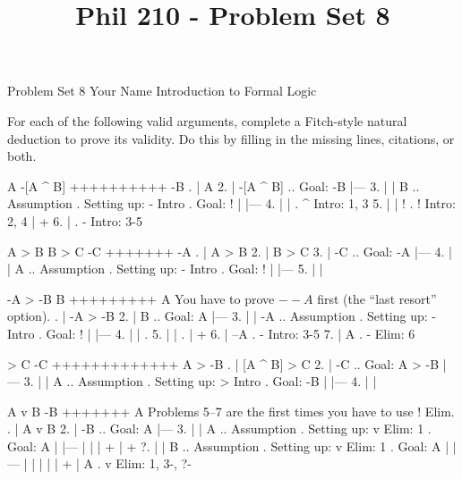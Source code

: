 
\title{Phil 210 - Problem Set 8}

\heading
Problem Set 8
Your Name
Introduction to Formal Logic
\endheading

For each of the following valid arguments, complete a Fitch-style natural deduction to prove its validity. Do this by filling in the missing lines, citations, or both.

\problems
{}
\argument
 A
 -[A ^ B]
++++++++++
 -B
\endargument
        \answer
        . | A
         2. | -[A ^ B]   ..  Goal: -B
            |---
         3. |   | B      ..  Assumption  .  Setting up: - Intro  .  Goal: !
            |   |---
         4. |   |        .  ^ Intro: 1, 3
         5. |   | !      .  ! Intro: 2, 4
            |   +
         6. |            .  - Intro: 3-5
        \endfitchproof
        \endanswer

\argument
 A > B
 B > C
 -C
+++++++
 -A
\endargument
        \answer
        . | A > B
         2. | B > C
         3. | -C      ..  Goal: -A
            |---
         4. |   | A   ..  Assumption  .  Setting up: - Intro  .  Goal: !
            |   |---
         5. |   | 
        \endfitchproof
        \endanswer

\argument
 -A > -B
 B
+++++++++
 A
\endargument
\Hint You have to prove $--A$ first (the ``last resort'' option).
        \answer
        . | -A > -B
         2. | B        ..  Goal: A
            |---
         3. |   | -A   ..  Assumption  .  Setting up: - Intro  .  Goal: !
            |   |---
         4. |   |      .  
         5. |   |      .  
            |   +
         6. | --A      .  - Intro: 3-5
         7. | A        .  - Elim: 6
        \endfitchproof
        \endanswer

\argument
 [A ^ B] > C
 -C
+++++++++++++
 A > -B
\endargument
        \answer
        . | [A ^ B] > C
         2. | -C            .. Goal: A > -B
            |---
         3. |   | A         ..  Assumption  .  Setting up: > Intro  .  Goal: -B
            |   |---
         4. |   | 
        \endfitchproof
        \endanswer

\widerfitchsetup
{}
\argument
 A v B
 -B
+++++++
 A
\endargument
\Hint Problems 5--7 are the first times you have to use $!$ Elim.
        \answer
        . | A v B
         2. | -B      ..  Goal: A
            |---
         3. |   | A   ..  Assumption  .  Setting up: v Elim: 1  .  Goal: A
            |   |---
            |   | 
            |   +
            |   +
         ?. |   | B   ..  Assumption  .  Setting up: v Elim: 1  .  Goal: A
            |   |---
            |   | 
            |   | 
            |   +
            | A       .  v Elim: 1, 3-, ?-
        \endfitchproof
        \endanswer

